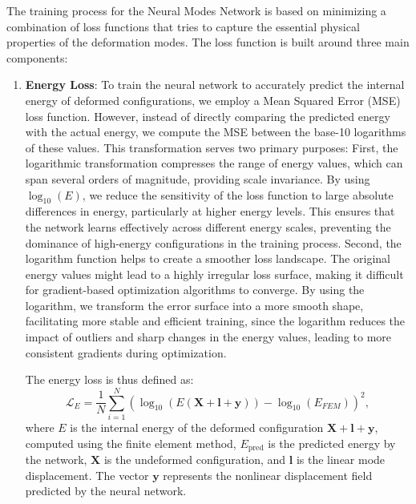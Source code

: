 The training process for the Neural Modes Network is based on minimizing a combination of loss functions that tries to capture the essential physical properties of the deformation modes. The loss function is built around three main components:
\begin{enumerate}
    \item \textbf{Energy Loss}: To train the neural network to accurately predict the internal energy of deformed configurations, we employ a Mean Squared Error (MSE) loss function.  However, instead of directly comparing the predicted energy with the actual energy, we compute the MSE between the base-10 logarithms of these values. This transformation serves two primary purposes: First, the logarithmic transformation compresses the range of energy values, which can span several orders of magnitude, providing scale invariance. By using $\log_{10}(E)$, we reduce the sensitivity of the loss function to large absolute differences in energy, particularly at higher energy levels. This ensures that the network learns effectively across different energy scales, preventing the dominance of high-energy configurations in the training process. Second, the logarithm function helps to create a smoother loss landscape. The original energy values might lead to a highly irregular loss surface, making it difficult for gradient-based optimization algorithms to converge. By using the logarithm, we transform the error surface into a more smooth shape, facilitating more stable and efficient training, since the logarithm reduces the impact of outliers and sharp changes in the energy values, leading to more consistent gradients during optimization.

    The energy loss is thus defined as:
    \begin{equation}
        \mathcal{L}_{E} = \frac{1}{N} \sum_{i=1}^N (\log_{10}(E(\bm{X} + \bm{l} + \bm{y})) - \log_{10}(E_{FEM}))^2,
    \end{equation}
    where \( E \) is the internal energy of the deformed configuration \( \bm{X} + \bm{l} + \bm{y} \), computed using the finite element method, \( E_{\text{pred}} \) is the predicted energy by the network, \( \bm{X} \) is the undeformed configuration, and \( \bm{l} \) is the linear mode displacement.  The vector \(\bm{y}\) represents the nonlinear displacement field predicted by the neural network.
    

\end{enumerate}
